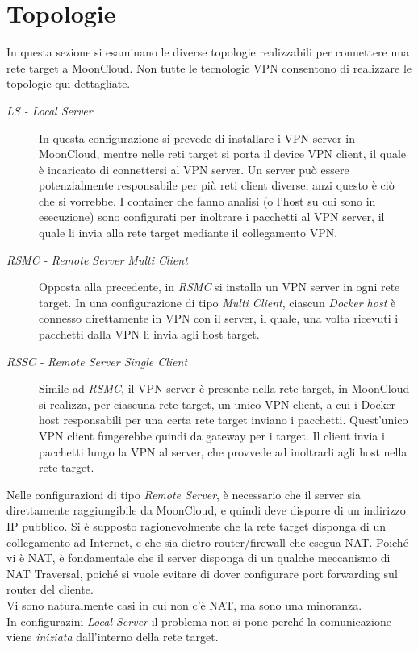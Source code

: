 \section{Topologie}
In questa sezione si esaminano le diverse topologie realizzabili per connettere una rete
target a MoonCloud. Non tutte le tecnologie VPN consentono di realizzare le topologie qui
dettagliate.
\begin{description}
	\item[\textit{LS - Local Server}]In questa configurazione si prevede di installare i
	VPN server in MoonCloud, mentre nelle reti target si porta il device
	VPN client, il quale è incaricato di connettersi al VPN server. Un server può essere
	potenzialmente responsabile per più reti client diverse, anzi questo
	è ciò che si vorrebbe. I container che fanno analisi
	(o l'host su cui sono in esecuzione)
	sono configurati per inoltrare i pacchetti al VPN server, il quale li invia alla rete
	target mediante il collegamento VPN.
	\item[\textit{RSMC - Remote Server Multi Client}]Opposta alla precedente, in \textit{RSMC}
	si installa un VPN server in ogni rete target. In una configurazione di tipo
	\textit{Multi Client}, ciascun \textit{Docker host} è connesso direttamente in VPN con il server, il
	quale, una volta ricevuti i pacchetti dalla VPN li invia agli host target.
	\item[\textit{RSSC - Remote Server Single Client}]Simile ad \textit{RSMC}, il VPN
	server è presente nella rete target, in MoonCloud si realizza, per ciascuna rete
	target, un unico VPN client, a cui i Docker host responsabili per una certa rete target inviano
	i pacchetti. Quest'unico VPN client fungerebbe quindi da gateway per i target.
	Il client invia i pacchetti lungo la VPN al server,
	che provvede ad inoltrarli agli host nella rete target.
\end{description}
Nelle configurazioni di tipo \textit{Remote Server}, è necessario che il server sia
direttamente raggiungibile da MoonCloud, e quindi deve disporre di un indirizzo IP pubblico.
Si è supposto ragionevolmente che la rete target disponga di un collegamento ad Internet, e che
sia dietro router/firewall che esegua NAT. Poiché vi è NAT, è fondamentale che il server disponga
di un qualche meccanismo di NAT Traversal, poiché si vuole evitare di dover configurare
port forwarding sul router del cliente.\\
Vi sono naturalmente casi in cui non c'è NAT, ma sono una minoranza.\\
In configurazini \textit{Local Server} il problema non si pone perché la comunicazione viene
\textit{iniziata} dall'interno della rete target.

